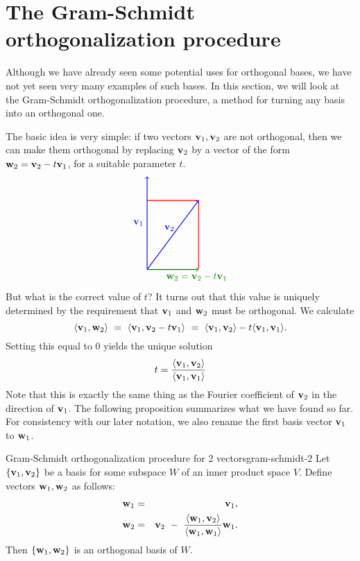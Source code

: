 \section{The Gram-Schmidt orthogonalization procedure}

Although we have already seen some potential uses for orthogonal
bases, we have not yet seen very many examples of such bases. In this
section, we will look at the Gram-Schmidt orthogonalization procedure,
a method for turning any basis into an orthogonal one.

The basic idea is very simple: if two vectors $\vect{v}_1,\vect{v}_2$
are not orthogonal, then we can make them orthogonal by replacing
$\vect{v}_2$ by a vector of the form $\vect{w}_2 = \vect{v}_2 -
t\vect{v}_1$, for a suitable parameter $t$.
\begin{equation*}
  \begin{tikzpicture}[scale=1.25]
    \draw[thick,red] (1.5,0) -- (1.5,2) -- (0,2);
    \draw[thick,blue,->] (0,0) -- node[left]{$\vect{v}_1$} (0,2.7);
    \draw[thick,blue,->] (0,0) -- node[left, pos=0.6]{$\vect{v}_2$} (1.5,2);
    \draw[thick,green!50!black,->] (0,0) -- node[below right, pos=0.3]{$\vect{w}_2 = \vect{v}_2 - t\vect{v}_1$} (1.5,0);
  \end{tikzpicture}
\end{equation*}
But what is the correct value of $t$? It turns out that this value is
uniquely determined by the requirement that $\vect{v}_1$ and
$\vect{w}_2$ must be orthogonal. We calculate
\begin{equation*}
  \iprod{\vect{v}_1,\vect{w}_2}
  ~=~ \iprod{\vect{v}_1,\vect{v}_2-t\vect{v}_1}
  ~=~ \iprod{\vect{v}_1,\vect{v}_2}-t\iprod{\vect{v}_1,\vect{v}_1}.
\end{equation*}
Setting this equal to $0$ yields the unique solution
\begin{equation*}
  t = \frac{\iprod{\vect{v}_1,\vect{v}_2}}{\iprod{\vect{v}_1,\vect{v}_1}}
\end{equation*}
Note that this is exactly the same thing as the Fourier coefficient of
$\vect{v}_2$ in the direction of $\vect{v}_1$. The following
proposition summarizes what we have found so far. For consistency with
our later notation, we also rename the first basis vector $\vect{v}_1$
to $\vect{w}_1$.

\begin{proposition}{Gram-Schmidt orthogonalization procedure for 2 vectors}{gram-schmidt-2}
  Let $\set{\vect{v}_1,\vect{v}_2}$ be a basis for some subspace $W$
  of an inner product space $V$. Define vectors
  $\vect{w}_1,\vect{w}_2$ as follows:
  \begin{eqnarray*}
    \vect{w}_1 &=& \vect{v}_1, \\
    \vect{w}_2 &=& \vect{v}_2 ~-~ \frac{\iprod{\vect{w}_1,\vect{v}_2}}{\iprod{\vect{w}_1,\vect{w}_1}}\vect{w}_1.
  \end{eqnarray*}
  Then $\set{\vect{w}_1,\vect{w}_2}$ is an orthogonal basis of $W$.
\end{proposition}

